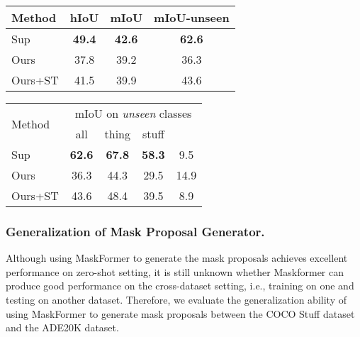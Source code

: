 \documentclass[runningheads]{llncs}
\makeatletter
\newcommand\tabcaption{\def\@captype{table}\caption}
\makeatother
\begin{document}
\begin{figtab}
\footnotesize
  \begin{minipage}[t]{0.48\linewidth}
    \centering
    \tabcaption{Comparison with supervised method on COCO Stuff validation dataset. Sup: MaskFormer trained on both \emph{seen} classes and \emph{unseen} classes.}
    \vspace{1.0em}
    \begin{tabular}{l|c|c|c}
    \toprule
    Method& hIoU&mIoU & mIoU-unseen\\
      \hline        
      Sup&\textbf{49.4}&\textbf{42.6}&\textbf{62.6}\\
      Ours&37.8&39.2&36.3\\
      Ours+ST&41.5&39.9&43.6\\
    \bottomrule
    \end{tabular}
    \label{tab:coco_stuff_sup}
  \end{minipage}\quad
  \begin{minipage}[t]{0.48\linewidth}
    \centering
    \tabcaption{Comparison  with supervised method on the \emph{unseen} classes of COCO Stuff validation set.  is the difference in mIoU between things and stuff of \emph{unseen} classes.}
    \vspace{0.5em}
    \begin{tabular}{l|c|c|c|c}
    \toprule
    \multirow{2}{*}{Method}&\multicolumn{4}{c}{mIoU on \emph{unseen} classes}\\
    \cline{2-5}
    & all&thing&stuff&\\
      \hline
      Sup&\textbf{62.6}&\textbf{67.8}&\textbf{58.3}&9.5\\
      Ours&36.3&44.3&29.5&14.9\\
      Ours+ST&43.6&48.4&39.5&8.9\\
    \bottomrule
    \end{tabular}
    \label{tab:coco_stuff_sup_thing_stuff}
  \end{minipage}
  \vspace{-1em}
\end{figtab}

\subsubsection{Generalization of Mask Proposal Generator.} 
Although using MaskFormer to generate the mask proposals achieves excellent performance on zero-shot setting, it is still unknown whether Maskformer can produce good performance on the cross-dataset setting, i.e., training on one and testing on another dataset. Therefore, we evaluate the generalization ability of using MaskFormer to generate mask proposals between the COCO Stuff dataset and the ADE20K dataset.
\end{document}
